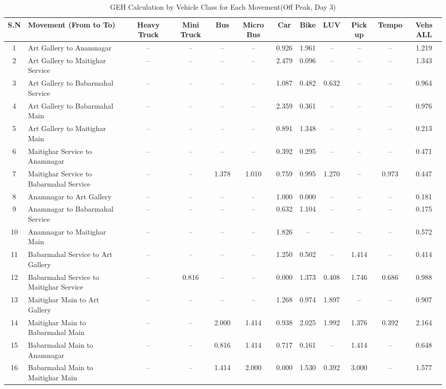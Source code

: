 \begin{landscape}
\begin{table}[h!]
\centering
\caption{GEH Calculation by Vehicle Class for Each Movement(Off Peak, Day 3)}
\small
\setlength{\tabcolsep}{5pt}
\begin{tabular}{|c|p{6cm}|c|c|c|c|c|c|c|c|c|c|}
\hline
S.N& Movement (From to To)& Heavy Truck & Mini Truck & Bus & Micro Bus & Car & Bike & LUV & Pick up & Tempo & Vehs ALL \\ \hline
1	&Art Gallery to Anamnagar	&–	&–	&–	&–	&0.926	&1.961	&–	&–	&–	&1.219 \\ \hline
2	&Art Gallery to Maitighar Service	&–	&–	&–	&–	&2.479	&0.096	&–	&–	&–	&1.343 \\ \hline
3	&Art Gallery to Babarmahal Service	&–	&–	&–	&–	&1.087	&0.482	&0.632	&–	&–	&0.964 \\ \hline
4	&Art Gallery to Babarmahal Main	&–	&–	&–	&–	&2.359	&0.361	&–	&–	&–	&0.976 \\ \hline
5	&Art Gallery to Maitighar Main	&–	&–	&–	&–	&0.891	&1.348	&–	&–	&–	&0.213 \\ \hline
6	&Maitighar Service to Anamnagar	&–	&–	&–	&–	&0.392	&0.295	&–	&–	&–	&0.471 \\ \hline
7	&Maitighar Service to Babarmahal Service	&–	&–	&1.378	&1.010	&0.759	&0.995	&1.270	&–	&0.973	&0.447 \\ \hline
8	&Anamnagar to Art Gallery	&–	&–	&–	&–	&1.000	&0.000	&–	&–	&–	&0.181 \\ \hline
9	&Anamnagar to Babarmahal Service	&–	&–	&–	&–	&0.632	&1.104	&–	&–	&–	&0.175 \\ \hline
10	&Anamnagar to Maitighar Main	&–	&–	&–	&–	&1.826	&–	&–	&–	&–	&0.572 \\ \hline
11	&Babarmahal Service to Art Gallery	&–	&–	&–	&–	&1.250	&0.502	&–	&1.414	&–	&0.414 \\ \hline
12	&Babarmahal Service to Maitighar Service	&–	&0.816	&–	&–	&0.000	&1.373	&0.408	&1.746	&0.686	&0.988 \\ \hline
13	&Maitighar Main to Art Gallery	&–	&–	&–	&–	&1.268	&0.974	&1.897	&–	&–	&0.907 \\ \hline
14	&Maitighar Main to Babarmahal Main	&–	&–	&2.000	&1.414	&0.938	&2.025	&1.992	&1.376	&0.392	&2.164 \\ \hline
15	&Babarmahal Main to Anamnagar	&–	&–	&0.816	&1.414	&0.717	&0.161	&–	&1.414	&–	&0.648 \\ \hline
16	&Babarmahal Main to Maitighar Main	&–	&–	&1.414	&2.000	&0.000	&1.530	&0.392	&3.000	&–	&1.577 \\ \hline


\end{tabular}
\end{table}
\end{landscape}


